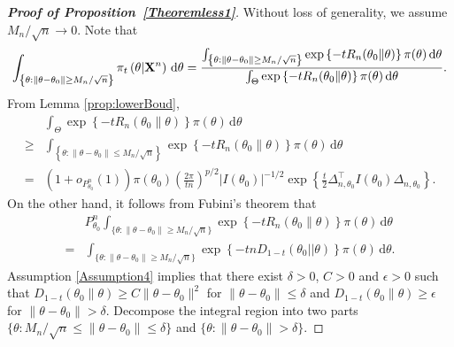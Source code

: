 \documentclass[11pt]{article}
\newcommand{\myT}{\intercal}
\theoremstyle{plain}
\theoremstyle{definition}
\theoremstyle{remark}
\begin{document}
\begin{appendices}
\begin{proof}[\textbf{Proof of Proposition~\ref{Theoremless1}}]
    Without loss of generality, we assume ${M_n}/{\sqrt{n}}\to 0$.
    Note that
    \begin{align*}
        \int_{ \left\{ \theta: \|\theta -\theta_0\|\geq M_n /\sqrt n \right\}} \pi_t\left( \theta |  \mathbf{X}^n \right)  \, \mathrm d \theta
        =
        \frac{
            \int_{ \left\{ \theta: \|\theta -\theta_0\|\geq M_n /\sqrt n \right\}}
    \exp\left\{  -t R_n (\theta_0 \| \theta) \right\} \pi(\theta) \, \mathrm d \theta
        }{
            \int_{ \Theta }
    \exp\left\{  -t R_n (\theta_0 \| \theta) \right\} \pi(\theta) \, \mathrm d \theta
}.
    \end{align*}
    From Lemma \ref{prop:lowerBoud},
    \begin{equation}
\label{deadline2:1}
    \begin{aligned}
            &
            \int_{ \Theta }
    \exp\left\{  -t R_n (\theta_0 \| \theta) \right\} \pi(\theta) \, \mathrm d \theta
    \\
\geq&
    \int_{\left\{ \theta: \|\theta - \theta_0\| \leq M_n/\sqrt n \right\}}
    \exp\left\{-t R_n(\theta_0\| \theta) \right\} \pi(\theta)
\, \mathrm d \theta
\\
=&
    (1+o_{P^n_{\theta_0}}(1))
    \pi(\theta_0)
    \left(\frac{2\pi}{t n}\right)^{{p}/{2}}
    |I(\theta_0)|^{-{1}/{2}} 
    \exp
    \left\{ 
        \frac{t}{2}\Delta_{n,\theta_0}^\myT  I({\theta_0})\Delta_{n,\theta_0}
\right\}
    .
        \end{aligned}
    \end{equation}
    On the other hand, it follows from Fubini's theorem that
\begin{align*}
    &P_{\theta_0}^n\int_{\{\theta:\|\theta-\theta_0\|\geq {M_n}/{\sqrt{n}}\} }
    \exp\left\{  -t R_n (\theta_0 \| \theta) \right\} \pi(\theta) \, \mathrm d \theta
    \\
    =& 
    \int_{\{\theta:\|\theta-\theta_0\|\geq {M_n}/{\sqrt{n}}\} } \exp \left\{-t n D_{1-t}(\theta_0||\theta) \right\} \pi(\theta) \, \mathrm d \theta.
\end{align*}
Assumption \ref{Assumption4} implies that there exist $\delta >0$, $C >0$ and $\epsilon > 0$ such that $D_{1-t}(\theta_0 \| \theta) \geq C \| \theta - \theta_0\|^2 $ for $\|\theta - \theta_0\| \leq \delta$ and $D_{1-t}(\theta_0 \| \theta)\geq \epsilon$ for $\|\theta - \theta_0\| >\delta$.
    Decompose the integral region into two parts $\{\theta:{M_n}/{\sqrt{n}}\leq \|\theta-\theta_0\|\leq \delta \}$ and $\{\theta: \|\theta-\theta_0\|>\delta\}$.

\end{proof}
\end{appendices}
\end{document}
